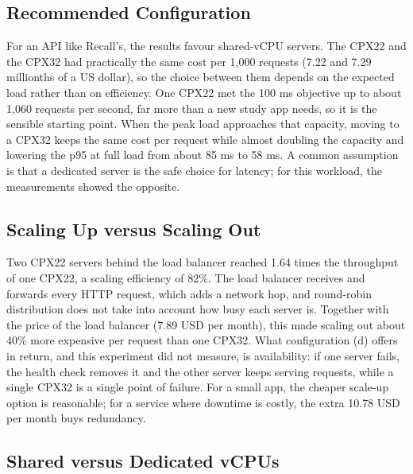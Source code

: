 \documentclass[conference,a4paper]{IEEEtran}
\begin{document}
\subsection{Recommended Configuration}

For an API like Recall's, the results favour shared-vCPU servers. The CPX22 and the CPX32 had practically the same cost per 1,000 requests (7.22 and 7.29 millionths of a US dollar), so the choice between them depends on the expected load rather than on efficiency. One CPX22 met the 100 ms objective up to about 1,060 requests per second, far more than a new study app needs, so it is the sensible starting point. When the peak load approaches that capacity, moving to a CPX32 keeps the same cost per request while almost doubling the capacity and lowering the p95 at full load from about 85 ms to 58 ms. A common assumption is that a dedicated server is the safe choice for latency; for this workload, the measurements showed the opposite.

\subsection{Scaling Up versus Scaling Out}

Two CPX22 servers behind the load balancer reached 1.64 times the throughput of one CPX22, a scaling efficiency of 82\%. The load balancer receives and forwards every HTTP request, which adds a network hop, and round-robin distribution does not take into account how busy each server is. Together with the price of the load balancer (7.89 USD per month), this made scaling out about 40\% more expensive per request than one CPX32. What configuration (d) offers in return, and this experiment did not measure, is availability: if one server fails, the health check removes it and the other server keeps serving requests, while a single CPX32 is a single point of failure. For a small app, the cheaper scale-up option is reasonable; for a service where downtime is costly, the extra 10.78 USD per month buys redundancy.

\subsection{Shared versus Dedicated vCPUs}
\end{document}
